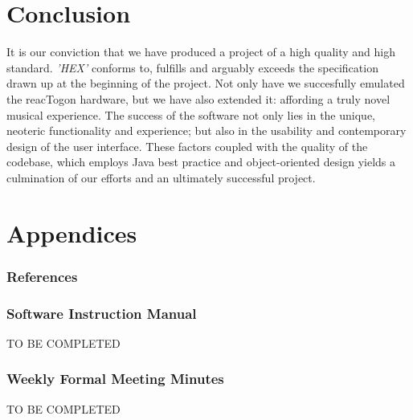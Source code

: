 \documentclass[10pt,a4paper]{article}
\begin{document}
\part{Conclusion}
It is our conviction that we have produced a project of a high quality and high standard. \textit{'HEX'} conforms to, fulfills and arguably exceeds the specification drawn up at the beginning of the project. Not only have we succesfully emulated the reacTogon hardware, but we have also extended it: affording a truly novel musical experience. The success of the software not only lies in the unique, neoteric functionality and experience; but also in the usability and contemporary design of the user interface. These factors coupled with the quality of the codebase, which employs Java best practice and object-oriented design yields a culmination of our efforts and an ultimately successful project.

\pagebreak
\part{Appendices}
\section{References}



\section{Software Instruction Manual}
TO BE COMPLETED
\section{Weekly Formal Meeting Minutes}
TO BE COMPLETED
\end{document}
